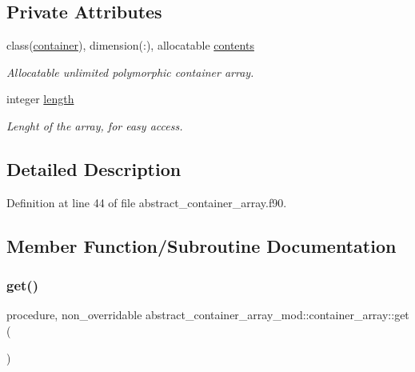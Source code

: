 \subsection*{Private Attributes}
\begin{DoxyCompactItemize}
\item 
class(\mbox{\hyperlink{structcontainer__mod_1_1container}{container}}), dimension(\+:), allocatable \mbox{\hyperlink{structabstract__container__array__mod_1_1container__array_a506bf56ce508f7041b765c7d19959902}{contents}}
\begin{DoxyCompactList}\small\item\em Allocatable unlimited polymorphic container array. \end{DoxyCompactList}\item 
integer \mbox{\hyperlink{structabstract__container__array__mod_1_1container__array_a0ec81671d521b7a118a83e79f1d40b56}{length}}
\begin{DoxyCompactList}\small\item\em Lenght of the array, for easy access. \end{DoxyCompactList}\end{DoxyCompactItemize}


\subsection{Detailed Description}


Definition at line 44 of file abstract\+\_\+container\+\_\+array.\+f90.



\subsection{Member Function/\+Subroutine Documentation}
\mbox{\label{structabstract__container__array__mod_1_1container__array_a9e7ee3cbe7bbcd28749369d010f8eb45}} 
\subsubsection{\texorpdfstring{get()}{get()}}
{\footnotesize\ttfamily procedure, non\+\_\+overridable abstract\+\_\+container\+\_\+array\+\_\+mod\+::container\+\_\+array\+::get (\begin{DoxyParamCaption}{ }\end{DoxyParamCaption})\hspace{0.3cm}{\ttfamily [private]}}



